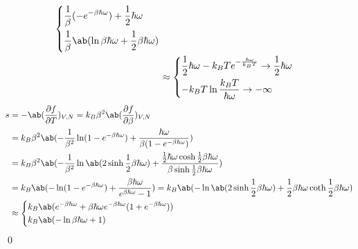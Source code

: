 \documentclass[uplatex,diffipdfmx,a4paper,11pt]{jlreq}
\makeatletter
\numberwithin{equation}{section}
\theoremstyle{definition}
\renewenvironment{proof}[1][\proofname]{\par
  \normalfont
  \topsep6\p@\@plus6\p@ \trivlist
  \item[\hskip\labelsep{\bfseries #1}\@addpunct{\bfseries}]\ignorespaces\quad\par
}{%
  \qed\endtrivlist\@endpefalse
}
\renewcommand\proofname{証明}
\makeatother
\begin{document}
\begin{proof}
\begin{align}
\begin{dcases}
                  \frac{1}{\beta}(-e^{-\beta\hbar\omega}) + \frac{1}{2}\hbar\omega       \\
                  \frac{1}{\beta}\ab(\ln \beta\hbar\omega + \frac{1}{2}\beta\hbar\omega) \\
                \end{dcases}                                                                                    \\
      & \approx \begin{dcases}
                  \frac{1}{2}\hbar\omega - k_BTe^{-\frac{\hbar\omega}{k_BT}} \to \frac{1}{2}\hbar\omega \\
                  -k_BT\ln\frac{k_BT}{\hbar\omega} \to - \infty                                         \\
                \end{dcases}
  \end{align}
  \begin{align}
    s & = - \ab(\diffp{f}{T})_{V,N} = k_B\beta^2\ab(\diffp{f}{\beta})_{V,N}                                                                                                                                              \\
      & = k_B\beta^2\ab(-\frac{1}{\beta^2}\ln(1 - e^{-\beta\hbar\omega}) + \frac{\hbar\omega}{\beta(1 - e^{-\beta\hbar\omega})})                                                                                         \\
      & = k_B\beta^2\ab(-\frac{1}{\beta^2}\ln\ab(2\sinh \frac{1}{2}\beta\hbar\omega) + \frac{\frac{1}{2}\hbar\omega\cosh \frac{1}{2}\beta\hbar\omega}{\beta\sinh \frac{1}{2}\beta\hbar\omega})                           \\
      & = k_B\ab(-\ln(1 - e^{-\beta\hbar\omega}) + \frac{\beta\hbar\omega}{e^{\beta\hbar\omega} - 1}) = k_B\ab(-\ln\ab(2\sinh\frac{1}{2}\beta\hbar\omega) + \frac{1}{2}\beta\hbar\omega\coth\frac{1}{2}\beta\hbar\omega) \\
      & \approx \begin{dcases}
                  k_B\ab(e^{-\beta\hbar\omega} + \beta\hbar\omega e^{-\beta\hbar\omega}(1 + e^{-\beta\hbar\omega})) \\
                  k_B\ab(-\ln\beta\hbar\omega + 1)                                                                  \\
                \end{dcases}                                                                                                        \\

\end{align}
\end{proof}
\end{document}
